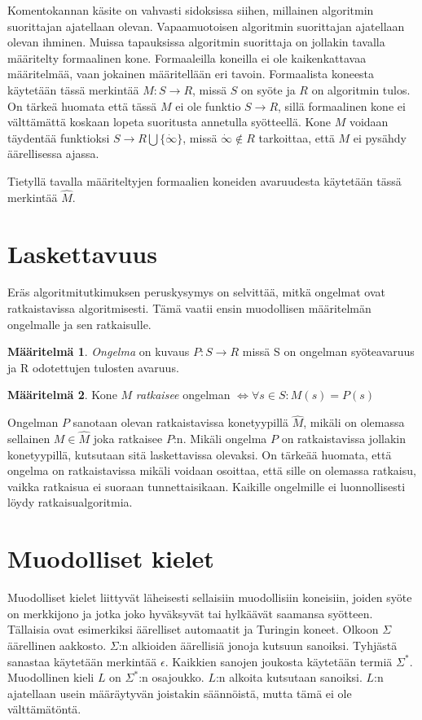 \documentclass[a4paper, 12pt]{article}
\theoremstyle{definition}
\newtheorem{mydef}{Määritelmä}
\theoremstyle{plain}
\begin{document}
Komentokannan käsite on vahvasti sidoksissa siihen, millainen algoritmin suorittajan ajatellaan olevan. Vapaamuotoisen algoritmin suorittajan ajatellaan olevan ihminen. Muissa tapauksissa algoritmin suorittaja on jollakin tavalla määritelty formaalinen kone. Formaaleilla koneilla ei ole kaikenkattavaa määritelmää, vaan jokainen määritellään eri tavoin. Formaalista koneesta käytetään tässä merkintää $M : S \rightarrow R$, missä $S$ on syöte ja $R$ on algoritmin tulos. On tärkeä huomata että tässä $M$ ei ole funktio $S \rightarrow R$, sillä formaalinen kone ei välttämättä koskaan lopeta suoritusta annetulla syötteellä. Kone $M$ voidaan täydentää funktioksi $S \rightarrow R \bigcup \{ \dot{\infty} \}$, missä $\dot{\infty} \notin R$ tarkoittaa, että $M$ ei pysähdy äärellisessa ajassa.

Tietyllä tavalla määriteltyjen formaalien koneiden avaruudesta käytetään tässä merkintää $\hat{M}$.


\section{Laskettavuus}
Eräs algoritmitutkimuksen peruskysymys on selvittää, mitkä ongelmat ovat ratkaistavissa algoritmisesti. Tämä vaatii ensin muodollisen määritelmän ongelmalle ja sen ratkaisulle.

\begin{mydef}
\emph{Ongelma} on kuvaus $P : S \rightarrow R$ missä S on ongelman syöteavaruus ja R odotettujen tulosten avaruus.
\end{mydef}
\begin{mydef}
Kone $M$ \emph{ratkaisee} ongelman $ \Leftrightarrow \forall s \in S : M(s) = P(s)$
\end{mydef}

Ongelman $P$ sanotaan olevan ratkaistavissa konetyypillä $\hat{M}$, mikäli on olemassa sellainen $M \in \hat{M}$ joka ratkaisee $P$:n. Mikäli ongelma $P$ on ratkaistavissa jollakin konetyypillä, kutsutaan sitä laskettavissa olevaksi. On tärkeää huomata, että ongelma on ratkaistavissa mikäli voidaan osoittaa, että sille on olemassa ratkaisu, vaikka ratkaisua ei suoraan tunnettaisikaan. Kaikille ongelmille ei luonnollisesti löydy ratkaisualgoritmia.

\section{Muodolliset kielet}

Muodolliset kielet liittyvät läheisesti sellaisiin muodollisiin koneisiin, joiden syöte on merkkijono ja jotka joko hyväksyvät tai hylkäävät saamansa syötteen. Tällaisia ovat esimerkiksi äärelliset automaatit ja Turingin koneet. Olkoon $\Sigma$ äärellinen aakkosto. $\Sigma$:n alkioiden äärellisiä jonoja kutsuun sanoiksi. Tyhjästä sanastaa käytetään merkintää $\epsilon$. Kaikkien sanojen joukosta käytetään termiä $\Sigma^*$. Muodollinen kieli $L$ on $\Sigma^*$:n osajoukko. $L$:n alkoita kutsutaan sanoiksi. $L$:n ajatellaan usein määräytyvän joistakin säännöistä, mutta tämä ei ole välttämätöntä.
\end{document}
